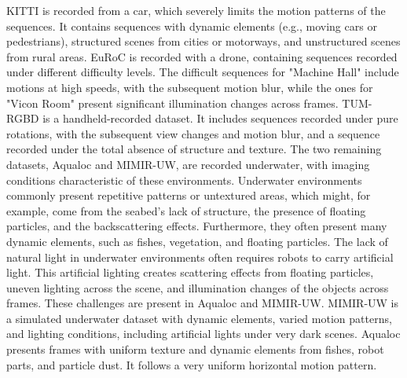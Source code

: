 KITTI is recorded from a car, which severely limits the motion patterns of the sequences. It contains sequences with dynamic elements (e.g., moving cars or pedestrians), structured scenes from cities or motorways, and unstructured scenes from rural areas. EuRoC \cite{dataset:burri2016euroc} is recorded with a drone, containing sequences recorded under different difficulty levels. The difficult sequences for "Machine Hall" include motions at high speeds, with the subsequent motion blur, while the ones for "Vicon Room" present significant illumination changes across frames. TUM-RGBD \cite{sturm2012tumrgbd} is a handheld-recorded dataset. It includes sequences recorded under pure rotations, with the subsequent view changes and motion blur, and a sequence recorded under the total absence of structure and texture. The two remaining datasets, Aqualoc and MIMIR-UW, are recorded underwater, with imaging conditions characteristic of these environments. Underwater environments commonly present repetitive patterns or untextured areas, which might, for example, come from the seabed's lack of structure, the presence of floating particles, and the backscattering effects.
Furthermore, they often present many dynamic elements, such as fishes, vegetation, and floating particles. The lack of natural light in underwater environments often requires robots to carry artificial light. This artificial lighting creates scattering effects from floating particles, uneven lighting across the scene, and illumination changes of the objects across frames. These challenges are present in Aqualoc and MIMIR-UW. 
MIMIR-UW is a simulated underwater dataset with dynamic elements, varied motion patterns, and lighting conditions, including artificial lights under very dark scenes. Aqualoc presents frames with uniform texture and dynamic elements from fishes, robot parts, and particle dust. It follows a very uniform horizontal motion pattern.

